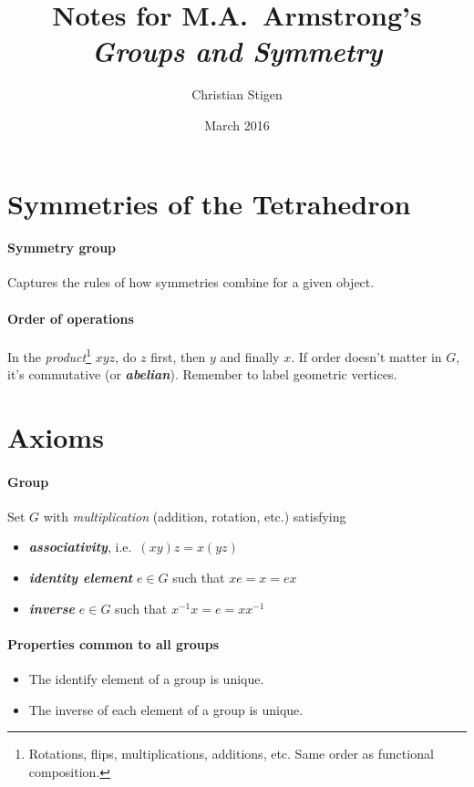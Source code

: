 \documentclass[a4paper,twocolumn,10pt]{article}
\title{Notes for M.A.~Armstrong's \textit{Groups and Symmetry}}
\author{Christian Stigen}
\date{March 2016}
\begin{document}
  \maketitle
  \section{Symmetries of the Tetrahedron}
  \paragraph{Symmetry group} Captures the rules of how symmetries combine for a
  given object.

  \paragraph{Order of operations} In the \textit{product}\footnote{Rotations,
  flips, multiplications, additions, etc. Same order as functional
  composition.} $xyz$, do $z$ first, then $y$ and finally $x$. If order doesn't
  matter in $G$, it's commutative (or \textbf{\textit{abelian}}). Remember to
  label geometric vertices.

  \section{Axioms}
  \paragraph{Group}  Set $G$ with \textit{multiplication} (addition,
  rotation, etc.) satisfying
  \begin{itemize}
    \item \textbf{\textit{associativity}}, i.e.~$(xy)z = x(yz)$
    \item \textbf{\textit{identity element}} $e \in G$ such that $xe=x=ex$
    \item \textbf{\textit{inverse}} $e \in G$ such that $x^{-1}x=e=xx^{-1}$
  \end{itemize}

  \paragraph{Properties common to all groups}
  \begin{itemize}
    \item The identify element of a group is unique.
    \item The inverse of each element of a group is unique.
  \end{itemize}
\end{document}
